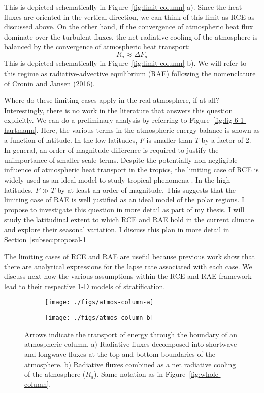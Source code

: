\documentclass{article}
\begin{document}
This is depicted schematically in Figure~\ref{fig:limit-column} a). Since the heat fluxes are oriented in the vertical direction, we can think of this limit as RCE as discussed above. On the other hand, if the convergence of atmospheric heat flux dominate over the turbulent fluxes, the net radiative cooling of the atmosphere is balanced by the convergence of atmospheric heat transport:
\begin{equation}
R_a \approx \Delta F_a
\end{equation}
This is depicted schematically in Figure~\ref{fig:limit-column} b). We will refer to this regime as radiative-advective equilibrium (RAE) following the nomenclature of Cronin and Jansen (2016).

Where do these limiting cases apply in the real atmosphere, if at all? Interestingly, there is no work in the literature that answers this question explicitly. We can do a preliminary analysis by referring to Figure~\ref{fig:fig-6-1-hartmann}. Here, the various terms in the atmospheric energy balance is shown as a function of latitude. In the low latitudes, $F$ is smaller than $T$ by a factor of 2. In general, an order of magnitude difference is required to justify the unimportance of smaller scale terms. Despite the potentially non-negligible influence of atmospheric heat transport in the tropics, the limiting case of RCE is widely used as an ideal model to study tropical phenomena \citep{wing-et-al-2018}. In the high latitudes, $F \gg T$ by at least an order of magnitude. This suggests that the limiting case of RAE is well justified as an ideal model of the polar regions. I propose to investigate this question in more detail as part of my thesis. I will study the latitudinal extent to which RCE and RAE hold in the current climate and explore their seasonal variation. I discuss this plan in more detail in Section~\ref{subsec:proposal-1}

The limiting cases of RCE and RAE are useful because previous work show that there are analytical expressions for the lapse rate associated with each case. We discuss next how the various assumptions within the RCE and RAE framework lead to their respective 1-D models of stratification.

\begin{figure}
\centering
\begin{subfigure}{0.5\textwidth}
\texttt{[image: ./figs/atmos-column-a]}
\end{subfigure}%
\begin{subfigure}{0.5\textwidth}
\texttt{[image: ./figs/atmos-column-b]}
\end{subfigure}
\caption{Arrows indicate the transport of energy through the boundary of an atmospheric column. a) Radiative fluxes decomposed into shortwave and longwave fluxes at the top and bottom boundaries of the atmosphere. b) Radiative fluxes combined as a net radiative cooling of the atmosphere ($R_a$). Same notation as in Figure~\ref{fig:whole-column}.}
\label{fig:atmos-column}
\end{figure}
\end{document}
